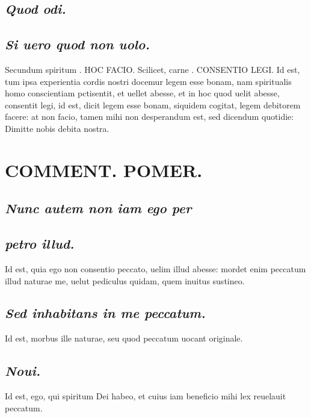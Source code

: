 \documentclass{article}
\begin{document}
\begin{pages}
\subsection*{\textit{Quod odi. }}
{}
\subsection*{\textit{Si uero quod non uolo. }}\pstart Secundum spiritum . HOC FACIO.  Scilicet, carne . CONSENTIO LEGI.  Id est, tum ipsa experientia cordis nostri docemur legem esse bonam, nam spiritualis homo conscientiam pctisentit, et uellet abesse, et in hoc quod uelit abesse, consentit legi, id est, dicit legem esse bonam, siquidem cogitat, legem debitorem facere: at non facio, tamen mihi non desperandum est, sed dicendum quotidie: Dimitte nobis debita nostra.   \pend
\section*{COMMENT. POMER.  }
{}
\subsection*{\textit{Nunc autem non iam ego per}}
{}
\subsection*{\textit{petro illud. }}\pstart Id est, quia ego non consentio peccato, uelim illud abesse: mordet enim peccatum illud naturae me, uelut pediculus quidam, quem inuitus sustineo.   \pend
{}
{}
\subsection*{\textit{Sed inhabitans in me peccatum. }}\pstart Id est, morbus ille naturae, seu quod peccatum uocant originale.   \pend
{}
{}
\subsection*{\textit{Noui. }}\pstart Id est, ego, qui spiritum Dei habeo, et cuius iam beneficio mihi lex reuelauit peccatum.   \pend
{}
{}

\end{pages}
\end{document}
